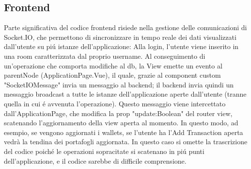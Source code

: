 \documentclass{report}
\begin{document}
\subsection{Frontend}
Parte significativa del codice frontend risiede nella gestione delle comunicazioni di Socket.IO, che permettono di sincronizzare in tempo reale dei dati visualizzati dall'utente su piú istanze dell'applicazione:
Alla login, l'utente viene inserito in una room caratterizzata dal proprio username.
Al conseguimento di un'operazione che comporta modifiche al db, la View emette un evento al parentNode (ApplicationPage.Vue), il quale, grazie al component custom "SocketIOMessage" invia un messaggio al backend;
il backend invia quindi un messaggio broadcast a tutte le istanze dell'applicazione aperte dall'utente (tranne quella in cui é avvenuta l'operazione).
Questo messaggio viene intercettato dall'ApplicationPage, che modifica la prop "update:Boolean" del router view, scatenando l'aggiornamento della view aperta al momento.
In questo modo, ad esempio, se vengono aggiornati i wallets, se l'utente ha l'Add Transaction aperta vedrà la tendina dei portafogli aggiornata.
\newline
\newline
In questo caso si omette la trascrizione del codice poiché le operazioni sopracitate si scatenano in piú punti dell'applicazione, e il codice sarebbe di difficile comprensione.
\newpage
\end{document}
